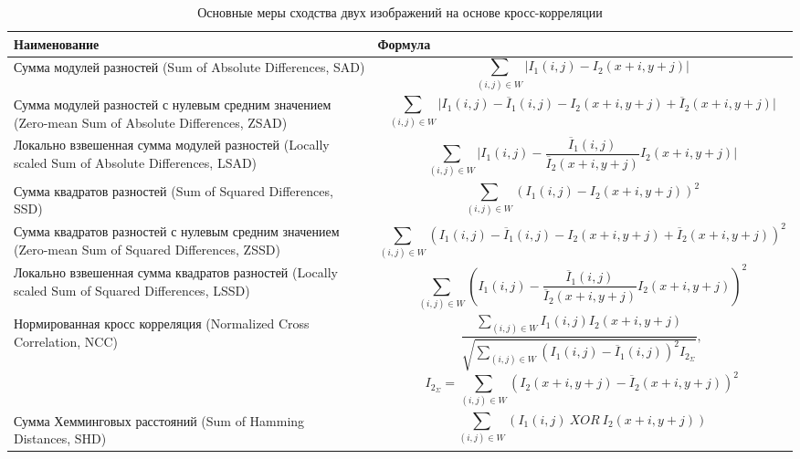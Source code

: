 \begin{table}[hbtp]
    \begin{tabu}[\textwidth]{|X[c,2,m]||X[c,4,m]|}
        \hline
        Наименование & Формула \\
        \hline
        Сумма модулей разностей (Sum of Absolute Differences, SAD) &
        $$
        \sum_{(i,j)\in W} \vert I_1(i,j) - I_2(x + i, y + j)\vert
        $$
        \\\hline
        Сумма модулей разностей с нулевым средним значением (Zero-mean 
        Sum of Absolute Differences, ZSAD) &
        $$
        \sum_{(i,j)\in W} \vert I_1(i,j) - \overline{I}_1(i,j) - I_2(x + i, y + j) + \overline{I}_2(x+i, y+j) \vert
        $$
        \\\hline
        Локально взвешенная сумма модулей разностей (Locally scaled Sum 
        of Absolute Differences, LSAD) &
        $$
        \sum_{(i,j)\in W} \vert I_1(i,j) - \frac{\overline{I}_1(i,j)}{\overline{I}_2(x+i,y+j)}I_2(x+i,y+j)\vert
        $$
        \\\hline
        Сумма квадратов разностей (Sum of Squared Differences, SSD) &
        $$
        \sum_{(i,j)\in W} (I_1(i,j) - I_2(x + i, y + j))^2
        $$
        \\\hline
        Сумма квадратов разностей с нулевым средним значением (Zero-mean 
        Sum of Squared Differences, ZSSD) &
        $$
        \sum_{(i,j)\in W}(I_1(i,j) - \overline{I}_1(i,j) - I_2(x + i, y + j) + \overline{I}_2(x+i, y+j))^2
        $$
        \\\hline
        Локально взвешенная сумма квадратов разностей (Locally scaled Sum 
        of Squared Differences, LSSD) &
        $$
        \sum_{(i,j)\in W} (I_1(i,j) - \frac{\overline{I}_1(i,j)}{\overline{I}_2(x+i,y+j)}I_2(x+i,y+j))^2
        $$
        \\\hline
        Нормированная кросс корреляция (Normalized Cross Correlation, NCC) &
        $$
        \frac{\sum_{(i,j)\in W}I_1(i,j)I_2(x + i, y + j)}{\sqrt{\sum_{(i,j)\in W}(I_1(i,j) -
        \overline{I}_1(i,j))^2 I_{2_\Sigma}}},$$$$
        I_{2_\Sigma} = \sum_{(i,j)\in
        W}(I_2(x + i, y + j) - \overline{I}_2(x+i, y+j))^2
        $$
        \\\hline
        Сумма Хемминговых расстояний (Sum of Hamming Distances, SHD) &
        $$
        \sum_{(i,j)\in W}(I_1(i,j)\ \mathit{XOR}\ I_2(x + i, y + j))
        $$
        \\\hline
    \end{tabu}
    \captionsetup{justification=centering}
    \caption{Основные меры сходства двух изображений на основе кросс-корреляции}
    \label{tables:correlations}
\end{table}

